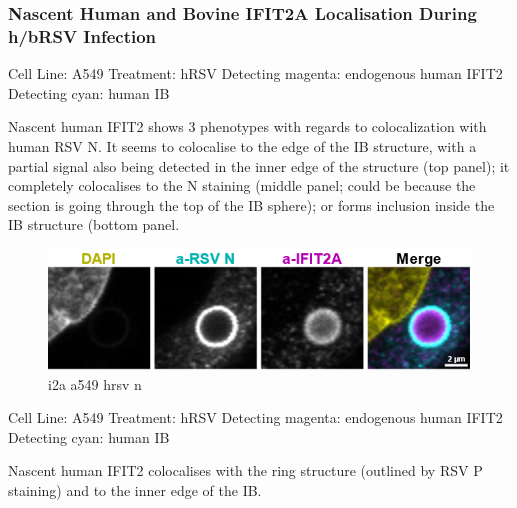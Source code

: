 \subsubsection{Nascent Human and Bovine IFIT2A Localisation During h/bRSV Infection} \label{Nascent Human and Bovine IFIT2A Localisation During h/bRSV Infection}
Cell Line: A549 \newline
Treatment: hRSV \newline
Detecting magenta: endogenous human IFIT2  \newline
Detecting cyan: human IB \newline

Nascent human IFIT2 shows 3 phenotypes with regards to colocalization with human RSV N. It seems to colocalise to the edge of the IB structure, with a partial signal also being detected in the inner edge of the structure (top panel); it completely colocalises to the N staining (middle panel; could be because the section is going through the top of the IB sphere); or forms inclusion inside the IB structure (bottom panel. 

\begin{figure}
    \centering
    \includegraphics[width=1\linewidth]{09. Chapter 4//Figs//01. I2A/04. i2a a549 hrsv n.png}
    \caption[i2a a549 hrsv n]{i2a a549 hrsv n}
    \label{i2a a549 hrsv n}
\end{figure}

Cell Line: A549 \newline
Treatment: hRSV \newline
Detecting magenta: endogenous human IFIT2  \newline
Detecting cyan: human IB \newline

Nascent human IFIT2 colocalises with the ring structure (outlined by RSV P staining) and to the inner edge of the IB.

